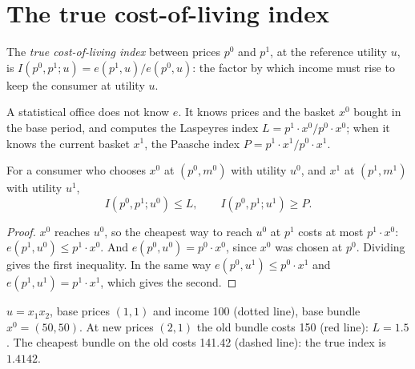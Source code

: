 \section{The true cost-of-living index}\label{sec:b1:consumer-welfare:col}

\begin{definition}\label{def:b1:consumer-welfare:col-index}
The \emph{true cost-of-living index} between prices $p^0$ and $p^1$, at the
reference utility $u$, is $I(p^0, p^1; u) = e(p^1, u)/e(p^0, u)$: the factor by
which income must rise to keep the consumer at utility $u$.
\end{definition}

A statistical office does not know $e$. It knows prices and the basket
$x^0$ bought in the base period, and computes the Laspeyres index
$L = p^1\cdot x^0/p^0\cdot x^0$; when it knows the current basket $x^1$, the
Paasche index $P = p^1\cdot x^1/p^0\cdot x^1$.

\begin{proposition}\label{prop:b1:consumer-welfare:bounds}
For a consumer who chooses $x^0$ at $(p^0, m^0)$ with utility $u^0$, and $x^1$ at
$(p^1, m^1)$ with utility $u^1$,
\[
I(p^0, p^1; u^0) \le L ,\qquad I(p^0, p^1; u^1) \ge P .
\]
\end{proposition}

\begin{proof}
$x^0$ reaches $u^0$, so the cheapest way to reach $u^0$ at $p^1$ costs at most
$p^1\cdot x^0$: $e(p^1, u^0) \le p^1\cdot x^0$. And $e(p^0, u^0) = p^0\cdot x^0$,
since $x^0$ was chosen at $p^0$. Dividing gives the first inequality. In the
same way $e(p^0, u^1) \le p^0\cdot x^1$ and $e(p^1, u^1) = p^1\cdot x^1$, which
gives the second.
\end{proof}

\begin{omfigure}

{\small $u = x_1x_2$, base prices $(1, 1)$ and income 100 (dotted line), base bundle
$x^0 = (50, 50)$. At new prices $(2, 1)$ the old bundle costs 150 (red line):
$L = 1.5$. The cheapest bundle on the old  costs 141.42
(dashed line): the true index is $1.4142$.}
\end{omfigure}

